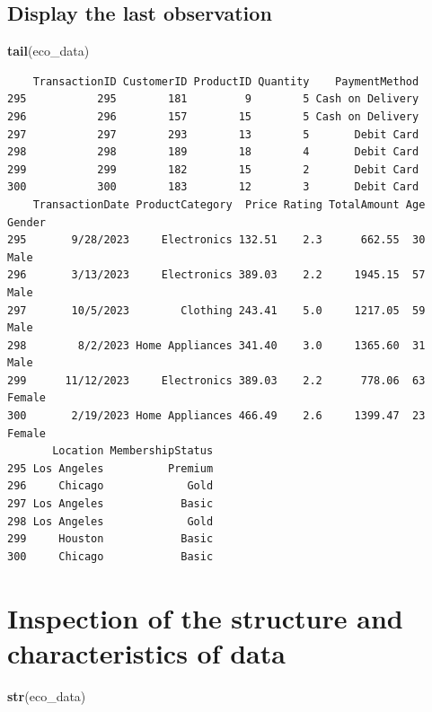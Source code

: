 \documentclass[
]{article}
\newenvironment{Shaded}{\begin{snugshade}}{\end{snugshade}}
\newcommand{\FunctionTok}[1]{\textcolor[rgb]{0.13,0.29,0.53}{\textbf{#1}}}
\newcommand{\NormalTok}[1]{#1}
\begin{document}
\subsection{Display the last
observation}\label{display-the-last-observation}

\begin{Shaded}
\begin{Highlighting}[]
\FunctionTok{tail}\NormalTok{(eco\_data)}
\end{Highlighting}
\end{Shaded}

\begin{verbatim}
    TransactionID CustomerID ProductID Quantity    PaymentMethod
295           295        181         9        5 Cash on Delivery
296           296        157        15        5 Cash on Delivery
297           297        293        13        5       Debit Card
298           298        189        18        4       Debit Card
299           299        182        15        2       Debit Card
300           300        183        12        3       Debit Card
    TransactionDate ProductCategory  Price Rating TotalAmount Age Gender
295       9/28/2023     Electronics 132.51    2.3      662.55  30   Male
296       3/13/2023     Electronics 389.03    2.2     1945.15  57   Male
297       10/5/2023        Clothing 243.41    5.0     1217.05  59   Male
298        8/2/2023 Home Appliances 341.40    3.0     1365.60  31   Male
299      11/12/2023     Electronics 389.03    2.2      778.06  63 Female
300       2/19/2023 Home Appliances 466.49    2.6     1399.47  23 Female
       Location MembershipStatus
295 Los Angeles          Premium
296     Chicago             Gold
297 Los Angeles            Basic
298 Los Angeles             Gold
299     Houston            Basic
300     Chicago            Basic
\end{verbatim}

\section{Inspection of the structure and characteristics of
data}\label{inspection-of-the-structure-and-characteristics-of-data}

\begin{Shaded}
\begin{Highlighting}[]
\FunctionTok{str}\NormalTok{(eco\_data)}
\end{Highlighting}
\end{Shaded}
\end{document}
